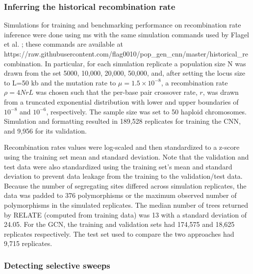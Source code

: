 \subsubsection{Inferring the historical recombination rate}

Simulations for training and benchmarking performance on recombination rate inference were done using ms \cite{hudsonGeneratingSamplesWright2002} with the same simulation commands used by Flagel et al. \cite{flagelUnreasonableEffectivenessConvolutional2019}; these commands are available at https://raw.githubusercontent.com/flag0010/pop\_gen\_cnn/master/historical\_recombination. In particular, for each simulation replicate a population size N was drawn from the set {5000, 10,000, 20,000, 50,000}, and, after setting the locus size to L=50 kb and the mutation rate to $\mu=1.5\times10^{-8}$, a recombination rate $\rho=4NrL$ was chosen such that the per-base pair crossover rate, $r$, was drawn from a truncated exponential distribution with lower and upper boundaries of $10^{-8}$ and $10^{-6}$, respectively. The sample size was set to 50 haploid chromosomes. Simulation and formatting resulted in 189,528 replicates for training the CNN, and 9,956 for its validation.

Recombination rates values were log-scaled and then standardized to a z-score using the training set mean and standard deviation. Note that the validation and test data were also standardized using the training set's mean and standard deviation to prevent data leakage from the training to the validation/test data. Because the number of segregating sites differed across simulation replicates, the data was padded to 376 polymorphisms or the maximum observed number of polymorphisms in the simulated replicates. The median number of trees returned by RELATE (computed from training data) was 13 with a standard deviation of 24.05. For the GCN, the training and validation sets had 174,575 and 18,625 replicates respectively. The test set used to compare the two approaches had 9,715 replicates.

\subsubsection{Detecting selective sweeps}

